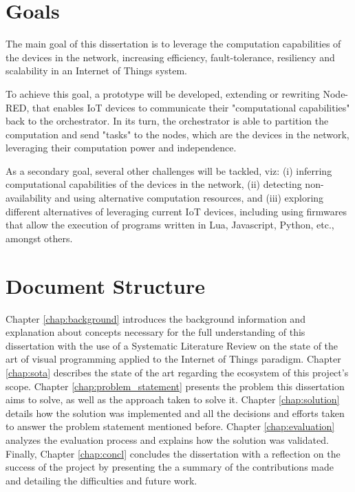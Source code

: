 \section{Goals} \label{sec:goals}

The main goal of this dissertation is to leverage the computation capabilities of the devices in the network, increasing efficiency, fault-tolerance, resiliency and scalability in an Internet of Things system.
\par To achieve this goal, a prototype will be developed, extending or rewriting Node-RED, that enables IoT devices to communicate their "computational capabilities" back to the orchestrator. In its turn, the orchestrator is able to partition the computation and send "tasks" to the nodes, which are the devices in the network, leveraging their computation power and independence.
\par As a secondary goal, several other challenges will be tackled, viz: (i) inferring computational capabilities of the devices in the network, (ii) detecting non-availability and using alternative computation resources, and (iii) exploring different alternatives of leveraging current IoT devices, including using firmwares that allow the execution of programs written in Lua, Javascript, Python, etc., amongst others.

\section{Document Structure} \label{sec:document structure}

Chapter \ref{chap:background} introduces the background information and explanation about concepts necessary for the full understanding of this dissertation with the use of a Systematic Literature Review on the state of the art of visual programming applied to the Internet of Things paradigm. Chapter \ref{chap:sota} describes the state of the art regarding the ecosystem of this project's scope. Chapter \ref{chap:problem_statement} presents the problem this dissertation aims to solve, as well as the approach taken to solve it. Chapter \ref{chap:solution} details how the solution was implemented and all the decisions and efforts taken to answer the problem statement mentioned before. Chapter \ref{chap:evaluation} analyzes the evaluation process and explains how the solution was validated. Finally, Chapter \ref{chap:concl} concludes the dissertation with a reflection on the success of the project by presenting the a summary of the contributions made and detailing the difficulties and future work.
